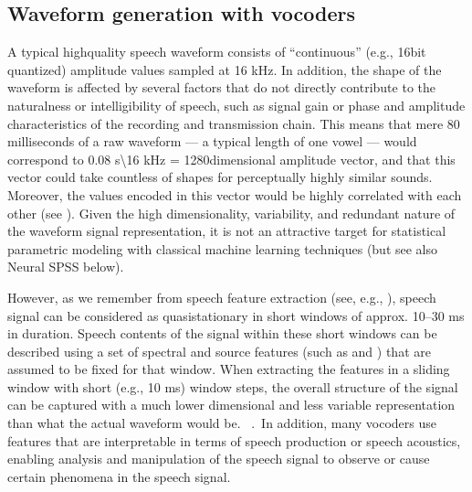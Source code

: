 \documentclass[letterpaper,10pt,english]{jupyterBook}
\begin{document}
\subsection{Waveform generation with vocoders}
\label{\detokenize{Synthesis/Statistical_parametric_speech_synthesis:waveform-generation-with-vocoders}}
\sphinxAtStartPar
A typical high\sphinxhyphen{}quality speech waveform consists of “continuous” (e.g.,
16\sphinxhyphen{}bit quantized) amplitude values sampled at 16 kHz. In addition, the
shape of the waveform is affected by several factors that do not
directly contribute to the naturalness or intelligibility of speech,
such as signal gain or phase and amplitude characteristics of the
recording and transmission chain. This means that mere 80 milliseconds
of a raw waveform — a typical length of one vowel — would correspond to
0.08 s\textbackslash{}16 kHz = 1280\sphinxhyphen{}dimensional amplitude vector, and that this
vector could take countless of shapes for perceptually highly similar
sounds. Moreover, the values encoded in this vector would be highly
correlated with each other (see ). Given the
high dimensionality, variability, and redundant nature of the waveform
signal representation, it is not an attractive target for statistical
parametric modeling with classical machine learning techniques (but see
also Neural SPSS below).

\sphinxAtStartPar
However, as we remember from speech feature extraction (see, e.g.,
), speech signal can be considered as
quasi\sphinxhyphen{}stationary in short windows of approx. 10–30 ms in duration.
Speech contents of the signal within these short windows can be
described using a set of spectral and source features (such as
 and ) that are
assumed to be fixed for that window. When extracting the features in a
sliding window with short (e.g., 10 ms) window steps, the overall
structure of the signal can be captured with a much lower dimensional
and less variable representation than what the actual waveform would
be.  . In addition, many
vocoders use features that are interpretable in terms of speech
production or speech acoustics, enabling analysis and manipulation of
the speech signal to observe or cause certain phenomena in the speech
signal.
\end{document}
